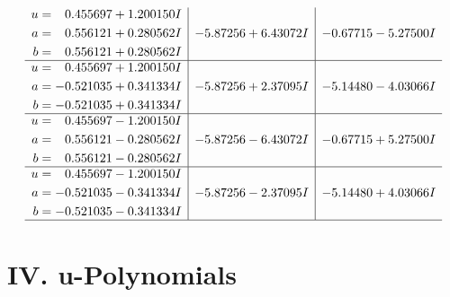 \documentclass[1p]{elsarticle_modified}
\theoremstyle{definition}
\begin{document}
$$\begin{array}{c|c|c}
\begin{aligned}
u &= \phantom{-}0.455697 + 1.200150 I \\
a &= \phantom{-}0.556121 + 0.280562 I \\
b &= \phantom{-}0.556121 + 0.280562 I\end{aligned}
 & -5.87256 + 6.43072 I & -0.67715 - 5.27500 I \\ \hline\begin{aligned}
u &= \phantom{-}0.455697 + 1.200150 I \\
a &= -0.521035 + 0.341334 I \\
b &= -0.521035 + 0.341334 I\end{aligned}
 & -5.87256 + 2.37095 I & -5.14480 - 4.03066 I \\ \hline\begin{aligned}
u &= \phantom{-}0.455697 - 1.200150 I \\
a &= \phantom{-}0.556121 - 0.280562 I \\
b &= \phantom{-}0.556121 - 0.280562 I\end{aligned}
 & -5.87256 - 6.43072 I & -0.67715 + 5.27500 I \\ \hline\begin{aligned}
u &= \phantom{-}0.455697 - 1.200150 I \\
a &= -0.521035 - 0.341334 I \\
b &= -0.521035 - 0.341334 I\end{aligned}
 & -5.87256 - 2.37095 I & -5.14480 + 4.03066 I\\
 \hline 
 \end{array}$$\newpage
\newpage\renewcommand{\arraystretch}{1}
\centering \section*{ IV. u-Polynomials}
\end{document}
